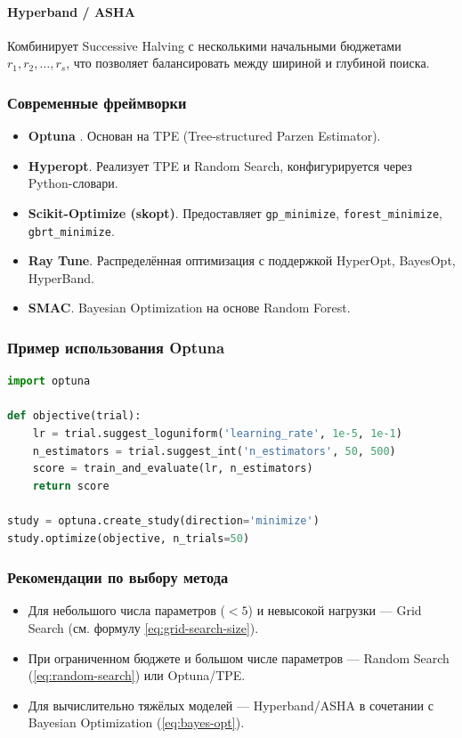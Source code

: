 \paragraph{Hyperband / ASHA}  
Комбинирует Successive Halving с несколькими начальными бюджетами \(r_1, r_2, \dots, r_s\), что позволяет балансировать между шириной и глубиной поиска.

\subsubsection{Современные фреймворки}

\begin{itemize}
  \item \textbf{Optuna} \cite{akiba2019optuna}. Основан на TPE (Tree-structured Parzen Estimator).
  \item \textbf{Hyperopt}. Реализует TPE и Random Search, конфигурируется через Python-словари.
  \item \textbf{Scikit-Optimize (skopt)}. Предоставляет \texttt{gp\_minimize}, \texttt{forest\_minimize}, \texttt{gbrt\_minimize}.
  \item \textbf{Ray Tune}. Распределённая оптимизация с поддержкой HyperOpt, BayesOpt, HyperBand.
  \item \textbf{SMAC}. Bayesian Optimization на основе Random Forest.
\end{itemize}

\subsubsection{Пример использования Optuna}

\begin{lstlisting}[language=Python]
import optuna

def objective(trial):
    lr = trial.suggest_loguniform('learning_rate', 1e-5, 1e-1)
    n_estimators = trial.suggest_int('n_estimators', 50, 500)
    score = train_and_evaluate(lr, n_estimators)
    return score

study = optuna.create_study(direction='minimize')
study.optimize(objective, n_trials=50)
\end{lstlisting}

\subsubsection{Рекомендации по выбору метода}

\begin{itemize}
  \item Для небольшого числа параметров (\(<5\)) и невысокой нагрузки — Grid Search (см. формулу \eqref{eq:grid-search-size}).
  \item При ограниченном бюджете и большом числе параметров — Random Search (\eqref{eq:random-search}) или Optuna/TPE.
  \item Для вычислительно тяжёлых моделей — Hyperband/ASHA в сочетании с Bayesian Optimization (\eqref{eq:bayes-opt}).
\end{itemize}

